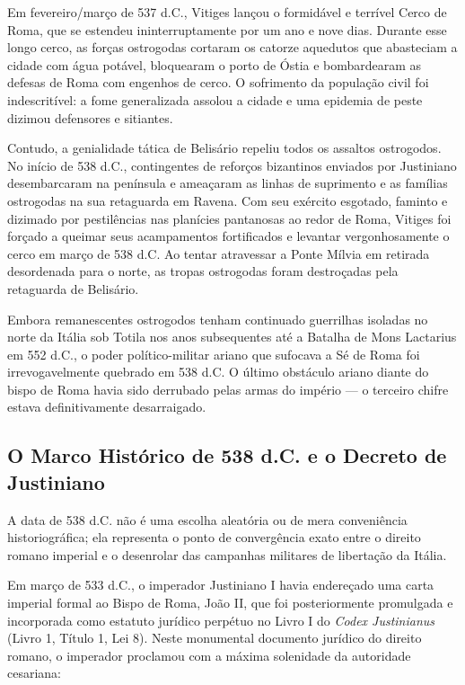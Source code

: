 Em fevereiro/março de 537 d.C., Vitiges lançou o formidável e terrível Cerco de Roma, que se estendeu ininterruptamente por um ano e nove dias. Durante esse longo cerco, as forças ostrogodas cortaram os catorze aquedutos que abasteciam a cidade com água potável, bloquearam o porto de Óstia e bombardearam as defesas de Roma com engenhos de cerco. O sofrimento da população civil foi indescritível: a fome generalizada assolou a cidade e uma epidemia de peste dizimou defensores e sitiantes.

Contudo, a genialidade tática de Belisário repeliu todos os assaltos ostrogodos. No início de 538 d.C., contingentes de reforços bizantinos enviados por Justiniano desembarcaram na península e ameaçaram as linhas de suprimento e as famílias ostrogodas na sua retaguarda em Ravena. Com seu exército esgotado, faminto e dizimado por pestilências nas planícies pantanosas ao redor de Roma, Vitiges foi forçado a queimar seus acampamentos fortificados e levantar vergonhosamente o cerco em março de 538 d.C. Ao tentar atravessar a Ponte Mílvia em retirada desordenada para o norte, as tropas ostrogodas foram destroçadas pela retaguarda de Belisário.

Embora remanescentes ostrogodos tenham continuado guerrilhas isoladas no norte da Itália sob Totila nos anos subsequentes até a Batalha de Mons Lactarius em 552 d.C., o poder político-militar ariano que sufocava a Sé de Roma foi irrevogavelmente quebrado em 538 d.C. O último obstáculo ariano diante do bispo de Roma havia sido derrubado pelas armas do império — o terceiro chifre estava definitivamente desarraigado.



\subsection{O Marco Histórico de 538 d.C. e o Decreto de Justiniano}


A data de 538 d.C. não é uma escolha aleatória ou de mera conveniência historiográfica; ela representa o ponto de convergência exato entre o direito romano imperial e o desenrolar das campanhas militares de libertação da Itália.

Em março de 533 d.C., o imperador Justiniano I havia endereçado uma carta imperial formal ao Bispo de Roma, João II, que foi posteriormente promulgada e incorporada como estatuto jurídico perpétuo no Livro I do \textit{Codex Justinianus} (Livro 1, Título 1, Lei 8). Neste monumental documento jurídico do direito romano, o imperador proclamou com a máxima solenidade da autoridade cesariana:


